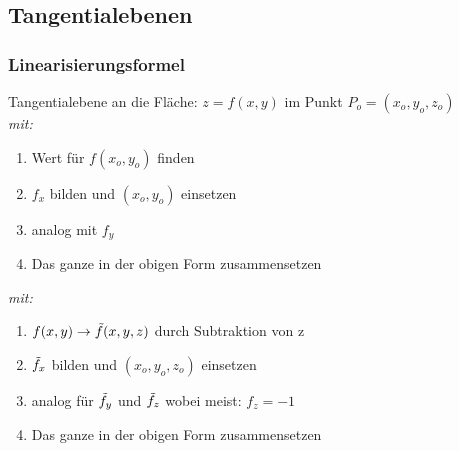 \subsection{Tangentialebenen} \vspace{3pt}
    \subsubsection{Linearisierungsformel}
        \vspace{3pt}
        
        Tangentialebene an die Fläche: $z = f(x,y) $ im Punkt $P_o = (x_o, y_o, z_o)$ \\[5pt]  
        \textit{mit:}
        \begin{enumerate}
            \item Wert für $f(x_o, y_o)$ finden
            \item $f_x$ bilden und $(x_o, y_o)$ einsetzen
            \item analog mit $f_y$ 
            \item Das ganze in der obigen Form zusammensetzen
        \end{enumerate}
        \vspace{5pt}
        
        \textit{mit:}
        \begin{enumerate}
            \item $f(x,y) \rightarrow \Tilde{f}(x,y,z)$  durch Subtraktion von z 
            \item $\Tilde{f}_x$ bilden und $(x_o, y_o, z_o)$ einsetzen
            \item analog für $\Tilde{f}_y$ und $\Tilde{f}_z$ wobei meist: $f_z = -1$
            \item Das ganze in der obigen Form zusammensetzen
        \end{enumerate}
        
          
        

